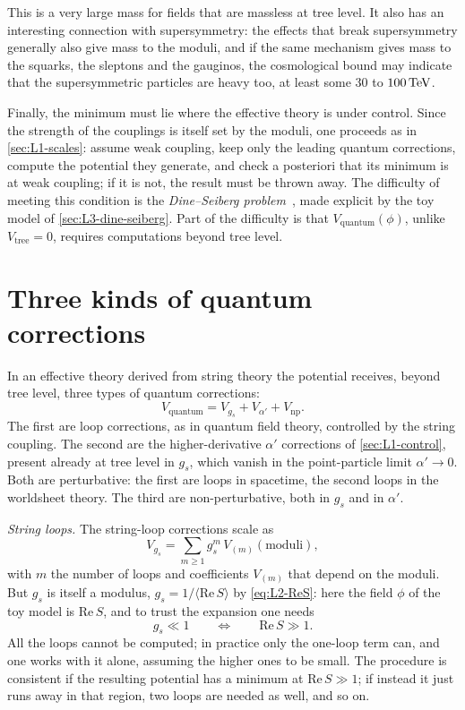 This is a very large mass for fields that are massless at tree level. It also has an interesting connection with supersymmetry: the effects that break supersymmetry generally also give mass to the moduli, and if the same mechanism gives mass to the squarks, the sleptons and the gauginos, the cosmological bound may indicate that the supersymmetric particles are heavy too, at least some $30$ to $100\,\mathrm{TeV}$.

Finally, the minimum must lie where the effective theory is under control. Since the strength of the couplings is itself set by the moduli, one proceeds as in \cref{sec:L1-scales}: assume weak coupling, keep only the leading quantum corrections, compute the potential they generate, and check a posteriori that its minimum is at weak coupling; if it is not, the result must be thrown away. The difficulty of meeting this condition is the \emph{Dine--Seiberg problem}~\cite{DineSeiberg}, made explicit by the toy model of \cref{sec:L3-dine-seiberg}. Part of the difficulty is that $V_{\text{quantum}}(\phi)$, unlike $V_{\text{tree}} = 0$, requires computations beyond tree level.

\section{Three kinds of quantum corrections}
\label{sec:L3-corrections}

In an effective theory derived from string theory the potential receives, beyond tree level, three types of quantum corrections:
\begin{equation}
  V_{\text{quantum}} = V_{g_s} + V_{\alpha'} + V_{\text{np}} .
  \label{eq:L3-Vquantum}
\end{equation}
The first are loop corrections, as in quantum field theory, controlled by the string coupling. The second are the higher-derivative $\alpha'$ corrections of \cref{sec:L1-control}, present already at tree level in $g_s$, which vanish in the point-particle limit $\alpha'\to0$. Both are perturbative: the first are loops in spacetime, the second loops in the worldsheet theory. The third are non-perturbative, both in $g_s$ and in $\alpha'$.

\emph{String loops.} The string-loop corrections scale as
\begin{equation}
  V_{g_s} = \sum_{m\ge1}g_s^m\,V_{(m)}(\text{moduli}) ,
  \label{eq:L3-Vgs}
\end{equation}
with $m$ the number of loops and coefficients $V_{(m)}$ that depend on the moduli. But $g_s$ is itself a modulus, $g_s = 1/\langle\mathrm{Re}\,S\rangle$ by \cref{eq:L2-ReS}: here the field $\phi$ of the toy model is $\mathrm{Re}\,S$, and to trust the expansion one needs
\begin{equation}
  g_s\ll1 \qquad\Longleftrightarrow\qquad \mathrm{Re}\,S\gg1 .
  \label{eq:L3-ReS}
\end{equation}
All the loops cannot be computed; in practice only the one-loop term can, and one works with it alone, assuming the higher ones to be small. The procedure is consistent if the resulting potential has a minimum at $\mathrm{Re}\,S\gg1$; if instead it just runs away in that region, two loops are needed as well, and so on.

